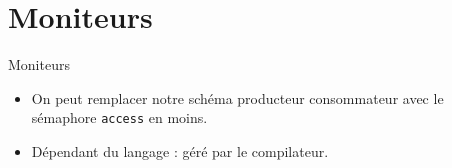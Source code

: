 \def\sectitle{Moniteurs}
\section{\sectitle}
\begin{frame}{\sectitle}
\begin{block}{\subsectitle}
\begin{itemize}
    \item On peut remplacer notre schéma producteur consommateur avec le 
    sémaphore \texttt{access} en moins.
    \item Dépendant du langage : géré par le compilateur.
\end{itemize}
\end{block}
\end{frame}


